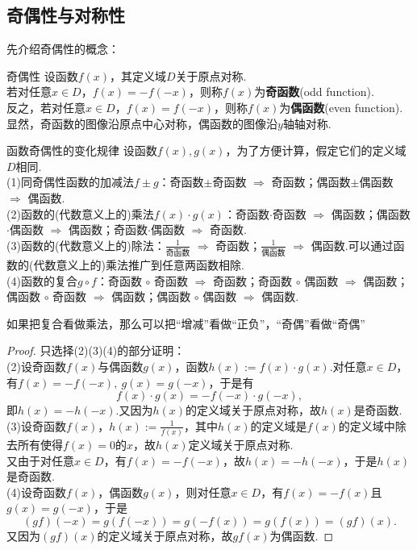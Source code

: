 \documentclass[lang=cn, zihao=5]{elegantbook}
\begin{document}
\vspace{2em}
\subsection{奇偶性与对称性}

先介绍奇偶性的概念：

\begin{definition}{奇偶性} %
    设函数$f(x)$，其定义域$D$关于原点对称.\\
    若对任意$x \in D$，$f(x)=-f(-x)$，则称$f(x)$为\textbf{奇函数}(odd function).\\
    反之，若对任意$x \in D$，$f(x)=f(-x)$，则称$f(x)$为\textbf{偶函数}(even function).\\
    显然，奇函数的图像沿原点中心对称，偶函数的图像沿$y$轴轴对称.
\end{definition}

\begin{proposition}{函数奇偶性的变化规律}
    设函数$f(x),g(x)$，为了方便计算，假定它们的定义域$D$相同.\\
    (1)同奇偶性函数的加减法$f \pm g$：奇函数$\pm$奇函数 $\Rightarrow$ 奇函数；偶函数$\pm$偶函数 $\Rightarrow$ 偶函数.\\
    (2)函数的(代数意义上的)乘法$f(x) \cdot g(x)$：奇函数$\cdot$奇函数 $\Rightarrow$ 偶函数；偶函数$\cdot$偶函数 $\Rightarrow$ 偶函数；奇函数$\cdot$偶函数 $\Rightarrow$ 奇函数.\\
    (3)函数的(代数意义上的)除法：$\frac{1}{\text{奇函数}}$ $\Rightarrow$ 奇函数；$\frac{1}{\text{偶函数}}$ $\Rightarrow$ 偶函数.可以通过函数的(代数意义上的)乘法推广到任意两函数相除.\\
    (4)函数的复合$g \circ f$：奇函数 $\circ$ 奇函数 $\Rightarrow$ 奇函数；奇函数 $\circ$ 偶函数 $\Rightarrow$ 偶函数；偶函数 $\circ$ 奇函数 $\Rightarrow$ 偶函数；偶函数 $\circ$ 偶函数 $\Rightarrow$ 偶函数.
\end{proposition}
\begin{remark}
	如果把复合看做乘法，那么可以把“增减”看做“正负”，“奇偶”看做“奇偶”
\end{remark}
\begin{proof}
    只选择(2)(3)(4)的部分证明： \\
    (2)设奇函数$f(x)$与偶函数$g(x)$，函数$h(x):=f(x) \cdot g(x)$.对任意$x \in D$，有$f(x)=-f(-x),~g(x)=g(-x)$，于是有$$f(x) \cdot g(x) = - f(-x) \cdot g(-x),$$
    即$h(x)=-h(-x)$.又因为$h(x)$的定义域关于原点对称，故$h(x)$是奇函数. \\
    (3)设奇函数$f(x)$，$h(x):=\frac{1}{f(x)}$，其中$h(x)$的定义域是$f(x)$的定义域中除去所有使得$f(x)=0$的$x$，故$h(x)$定义域关于原点对称. \\
    又由于对任意$x \in D$，有$f(x)=-f(-x)$，故$h(x)=-h(-x)$，于是$h(x)$是奇函数. \\
    (4)设奇函数$f(x)$，偶函数$g(x)$，则对任意$x \in D$，有$f(x)=-f(x)$且$g(x)=g(-x)$，于是$$(gf)(-x) = g(f(-x)) = g(-f(x)) = g(f(x)) = (gf)(x).$$
    又因为$(gf)(x)$的定义域关于原点对称，故$gf(x)$为偶函数.
\end{proof}
\end{document}
